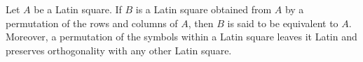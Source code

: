 Let $A$ be a Latin square. If $B$ is a Latin square obtained from $A$ by a permutation of the rows and columns of $A$, then $B$ is said to be equivalent to $A$. Moreover, a permutation of the symbols within a Latin square leaves it Latin and preserves orthogonality with any other Latin square.
